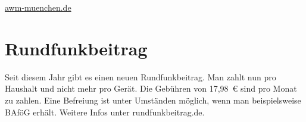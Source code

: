 \begin{urlList}
	\item \url{awm-muenchen.de}
\end{urlList}



\section{Rundfunkbeitrag}
Seit diesem Jahr gibt es einen neuen Rundfunkbeitrag. Man zahlt nun pro Haushalt und nicht mehr pro Gerät. Die Gebühren von 17,98~€ sind pro Monat zu zahlen. Eine Befreiung ist unter Umständen möglich, wenn man beispielsweise BAföG erhält. Weitere Infos unter rundfunkbeitrag.de.

